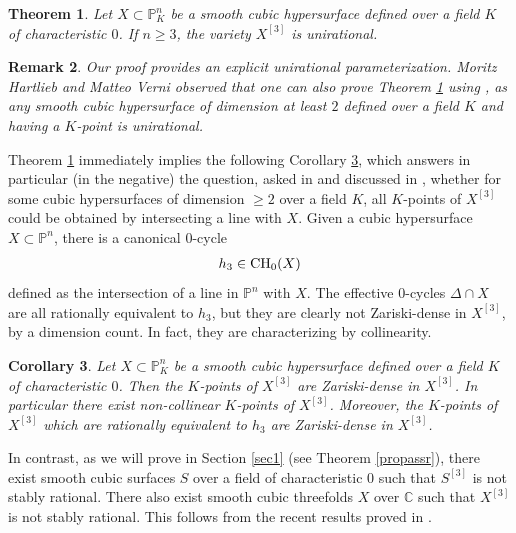 \documentclass[10pt]{article}
\newtheorem{theo}{Theorem}[section]
\newtheorem{coro}[theo]{Corollary}
\newtheorem{rema}[theo]{Remark}
\begin{document}
\begin{theo} \label{theounirat} Let $X\subset \mathbb{P}^n_K$ be a smooth cubic hypersurface defined over a field $K$ of characteristic $0$. If $n\geq 3$, the variety $X^{[3]}$ is unirational.
\end{theo}
\begin{rema}{\rm  Our proof provides an  explicit unirational parameterization. Moritz Hartlieb and Matteo Verni observed  that one can also prove Theorem \ref{theounirat} using \cite[Proposition 37]{kollarmella}, as any smooth cubic hypersurface of dimension at least $2$  defined over a field $K$ and having  a $K$-point is unirational.}
\end{rema}
Theorem \ref{theounirat}  immediately implies the following Corollary \ref{corodense}, which answers in particular (in the negative)  the question, asked in \cite[Question 6.2]{maq} and discussed in \cite{colliot}, whether for some  cubic hypersurfaces of dimension $\geq 2$ over a field $K$, all $K$-points of $X^{[3]}$ could be obtained by intersecting a line with $X$. Given a cubic hypersurface $X\subset \mathbb{P}^n$, there is a canonical $0$-cycle \begin{eqnarray}\label{eqhtrois} h_3\in {\rm CH}_0(X)\end{eqnarray}
 defined as the intersection of a line in $\mathbb{P}^n$ with $X$. The effective $0$-cycles $\Delta\cap X$ are all rationally equivalent to $h_3$, but they are clearly not Zariski-dense in $X^{[3]}$, by a dimension count. In fact, they are characterizing by collinearity.
\begin{coro} \label{corodense} Let $X\subset \mathbb{P}^n_K$ be a smooth cubic hypersurface defined over a field $K$ of characteristic $0$. Then the $K$-points of $X^{[3]}$ are Zariski-dense in $X^{[3]}$. In particular there exist non-collinear $K$-points of $X^{[3]}$. Moreover,  the $K$-points of $X^{[3]}$  which are rationally equivalent to $h_3$ are Zariski-dense in $X^{[3]}$.
\end{coro}


In contrast, as we will prove in  Section \ref{sec1} (see Theorem \ref{propassr}), there exist  smooth cubic surfaces $S$ over a field of characteristic $0$ such that $S^{[3]}$ is not  stably rational. There also exist smooth cubic threefolds $X$ over $\mathbb{C}$ such that $X^{[3]}$ is not  stably rational. This follows from the recent results proved in \cite{SEggay}.
\end{document}
